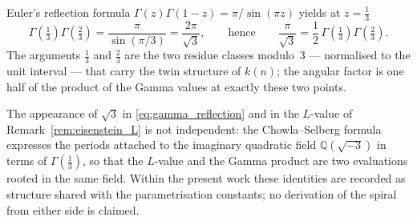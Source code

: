 \begin{remark}
\label{rem:gamma_reflection}
Euler's reflection formula
$\Gamma(z)\Gamma(1-z) = \pi/\sin(\pi z)$ yields at $z = \tfrac13$
\begin{equation}\label{eq:gamma_reflection}
  \Gamma\!\left(\tfrac13\right)\Gamma\!\left(\tfrac23\right)
  = \frac{\pi}{\sin(\pi/3)}
  = \frac{2\pi}{\sqrt{3}},
  \qquad\text{hence}\qquad
  \frac{\pi}{\sqrt{3}}
  = \frac{1}{2}\,\Gamma\!\left(\tfrac13\right)\Gamma\!\left(\tfrac23\right).
\end{equation}
The arguments $\tfrac13$ and $\tfrac23$ are the two residue classes
modulo~$3$ --- normalised to the unit interval --- that carry the twin
structure of $k(n)$; the angular factor is one half of the product of
the Gamma values at exactly these two points.

The appearance of $\sqrt{3}$ in \eqref{eq:gamma_reflection} and in the
$L$-value of Remark~\ref{rem:eisenstein_L} is not independent: the
Chowla--Selberg formula~\cite{ChowlaSelberg1967} expresses the periods
attached to the imaginary quadratic field $\mathbb{Q}(\sqrt{-3})$ in
terms of $\Gamma(\tfrac13)$, so that the $L$-value and the
Gamma product are two evaluations rooted in the same field. Within the
present work these identities are recorded as structure shared with
the parametrisation constants; no derivation of the spiral from either
side is claimed.
\end{remark}

